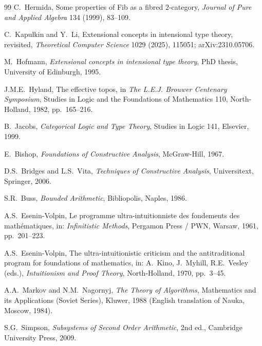 \documentclass[11pt]{article}
\theoremstyle{plain}
\theoremstyle{definition}
\begin{document}
\begin{thebibliography}{99}
C.~Hermida,
\newblock Some properties of Fib as a fibred $2$-category,
\newblock \emph{Journal of Pure and Applied Algebra} 134 (1999), 83--109.

C.~Kapulkin and Y.~Li,
\newblock Extensional concepts in intensional type theory, revisited,
\newblock \emph{Theoretical Computer Science} 1029 (2025), 115051; arXiv:2310.05706.

M.~Hofmann,
\newblock \emph{Extensional concepts in intensional type theory},
\newblock PhD thesis, University of Edinburgh, 1995.

J.M.E.~Hyland,
\newblock The effective topos,
\newblock in \emph{The L.E.J. Brouwer Centenary Symposium}, Studies in Logic and the Foundations of Mathematics 110, North-Holland, 1982, pp.~165--216.

B.~Jacobs,
\newblock \emph{Categorical Logic and Type Theory},
\newblock Studies in Logic 141, Elsevier, 1999.

E.~Bishop,
\newblock \emph{Foundations of Constructive Analysis},
\newblock McGraw-Hill, 1967.

D.S.~Bridges and L.S.~Vita,
\newblock \emph{Techniques of Constructive Analysis},
\newblock Universitext, Springer, 2006.

S.R.~Buss,
\newblock \emph{Bounded Arithmetic},
\newblock Bibliopolis, Naples, 1986.

A.S.~Esenin-Volpin,
\newblock Le programme ultra-intuitionniste des fondements des math\'ematiques,
\newblock in: \emph{Infinitistic Methods}, Pergamon Press / PWN, Warsaw, 1961, pp.~201--223.

A.S.~Esenin-Volpin,
\newblock The ultra-intuitionistic criticism and the antitraditional program for foundations of mathematics,
\newblock in: A.~Kino, J.~Myhill, R.E.~Vesley (eds.), \emph{Intuitionism and Proof Theory}, North-Holland, 1970, pp.~3--45.

A.A.~Markov and N.M.~Nagornyj,
\newblock \emph{The Theory of Algorithms},
\newblock Mathematics and its Applications (Soviet Series), Kluwer, 1988 (English translation of Nauka, Moscow, 1984).

S.G.~Simpson,
\newblock \emph{Subsystems of Second Order Arithmetic},
\newblock 2nd ed., Cambridge University Press, 2009.


\end{thebibliography}
\end{document}
